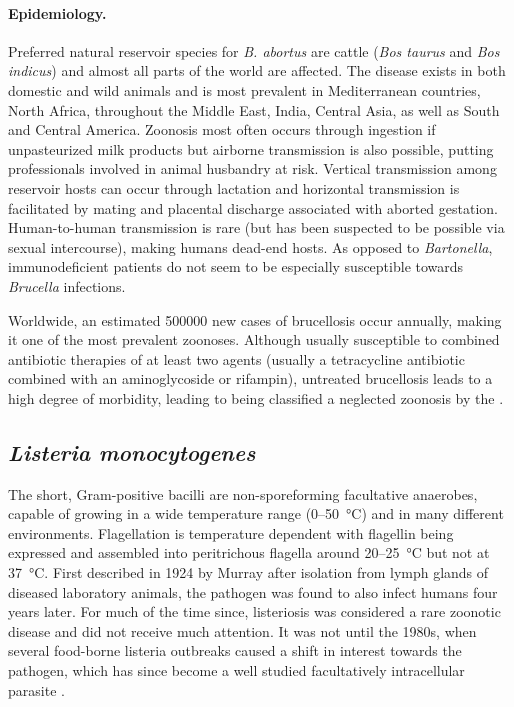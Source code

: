 \paragraph{Epidemiology.}
Preferred natural reservoir species for \textit{B. abortus} are cattle (\textit{Bos taurus} and \textit{Bos indicus}) and almost all parts of the world are affected. The disease exists in both domestic and wild animals and is most prevalent in Mediterranean countries, North Africa, throughout the Middle East, India, Central Asia, as well as South and Central America. Zoonosis most often occurs through ingestion if unpasteurized milk products but airborne transmission is also possible, putting professionals involved in animal husbandry at risk. Vertical transmission among reservoir hosts can occur through lactation and horizontal transmission is facilitated by mating and placental discharge associated with aborted gestation. Human-to-human transmission is rare (but has been suspected to be possible via sexual intercourse), making humans dead-end hosts. As opposed to \textit{Bartonella}, immunodeficient patients do not seem to be especially susceptible towards \textit{Brucella} infections.

Worldwide, an estimated 500000 new cases of brucellosis occur annually, making it one of the most prevalent zoonoses. Although usually susceptible to combined antibiotic therapies of at least two agents (usually a tetracycline antibiotic combined with an aminoglycoside or rifampin), untreated brucellosis leads to a high degree of morbidity, leading to being classified a neglected zoonosis by the .

\subsection{\textit{Listeria monocytogenes}}

The short, Gram-positive bacilli are non-sporeforming facultative anaerobes, capable of growing in a wide temperature range (0--\SI{50}{\celsius}) and in many different environments. Flagellation is temperature dependent with flagellin being expressed and assembled into peritrichous flagella around 20--\SI{25}{\celsius} but not at \SI{37}{\celsius}. First described in 1924 by Murray after isolation from lymph glands of diseased laboratory animals, the pathogen was found to also infect humans four years later. For much of the time since, listeriosis was considered a rare zoonotic disease and did not receive much attention. It was not until the 1980s, when several food-borne listeria outbreaks caused a shift in interest towards the pathogen, which has since become a well studied facultatively intracellular parasite \citep{Farber1991,Cossart2014}.


